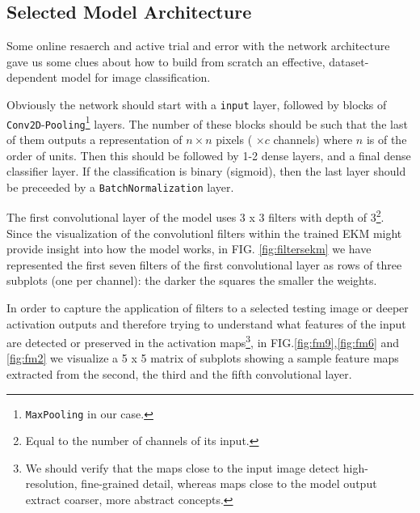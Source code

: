 \documentclass[aps,twocolumn,secnumarabic,nobalancelastpage,amsmath,amssymb,
nofootinbib]{revtex4}
\begin{document}
\subsection{Selected Model Architecture}\label{model-architecture}

Some online resaerch and active trial and error with the network
architecture gave us some clues about how to build from scratch an
effective, dataset-dependent model for image classification. \newline

Obviously the network should start with a \texttt{input} layer, followed
by blocks of \texttt{Conv2D}-\texttt{Pooling}\footnote{\texttt{MaxPooling}
in our case.} layers. The number of these blocks should be such that
the last of them outputs a representation of \(n \times n\) pixels (
\(\times c\) channels) where \(n\) is of the order of units. Then this
should be followed by 1-2 dense layers, and a final dense classifier
layer. If the classification is binary (sigmoid), then the last layer
should be preceeded by a \texttt{BatchNormalization} layer. \newline

The first convolutional layer of the model uses 3 x 3 filters with depth of 3\footnote{Equal to the number of channels of its input.}. Since the visualization of the convolutionl filters within the trained EKM might provide insight into how the model works, in FIG.  \ref{fig:filtersekm} we have represented the first seven filters of the first convolutional layer as rows of three subplots (one per channel): the darker the squares the smaller the weights. \newline

In order to capture the application of filters to a selected testing image or deeper activation outputs and therefore trying to understand what features of the input are detected or preserved in the activation maps\footnote{We should verify that the maps close to the input image
	detect high-resolution, fine-grained detail, whereas maps close to the
	model output extract coarser, more abstract concepts.}, in FIG.\ref{fig:fm9},\ref{fig:fm6} and \ref{fig:fm2} we visualize a 5 x 5 matrix of subplots
showing a sample feature maps extracted from the second, the third and the fifth convolutional layer.
\end{document}
